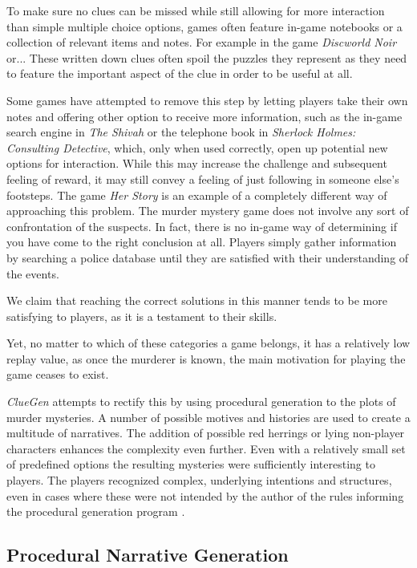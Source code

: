 To make sure no clues can be missed while still allowing for more interaction than simple multiple choice options, games often feature in-game notebooks or a collection of relevant items and notes.
For example in the game \emph{Discworld Noir} or... 
These written down clues often spoil the puzzles they represent as they need to feature the important aspect of the clue in order to be useful at all.

Some games have attempted to remove this step by letting players take their own notes and offering other option to receive more information, such as the in-game search engine in \emph{The Shivah} or the telephone book in \emph{Sherlock Holmes: Consulting Detective}, which, only when used correctly, open up potential new options for interaction.
While this may increase the challenge and subsequent feeling of reward, it may still convey a feeling of just following in someone else's footsteps.
The game \emph{Her Story} is an example of a completely different way of approaching this problem.
The murder mystery game does not involve any sort of confrontation of the suspects.
In fact, there is no in-game way of determining if you have come to the right conclusion at all.
Players simply gather information by searching a police database until they are satisfied with their understanding of the events.

We claim that reaching the correct solutions in this manner tends to be more satisfying to players, as it is a testament to their skills.

Yet, no matter to which of these categories a game belongs, it has a relatively low replay value, as once the murderer is known, the main motivation for playing the game ceases to exist.

\emph{ClueGen} attempts to rectify this by using procedural generation to the plots of murder mysteries.
A number of possible motives and histories are used to create a multitude of narratives.
The addition of possible red herrings or lying non-player characters enhances the complexity even further.
Even with a relatively small set of predefined options the resulting mysteries were sufficiently interesting to players.
The players recognized complex, underlying intentions and structures, even in cases where these were not intended by the author of the rules informing the procedural generation program \cite{stockdale_2016}.

\subsection{Procedural Narrative Generation}

